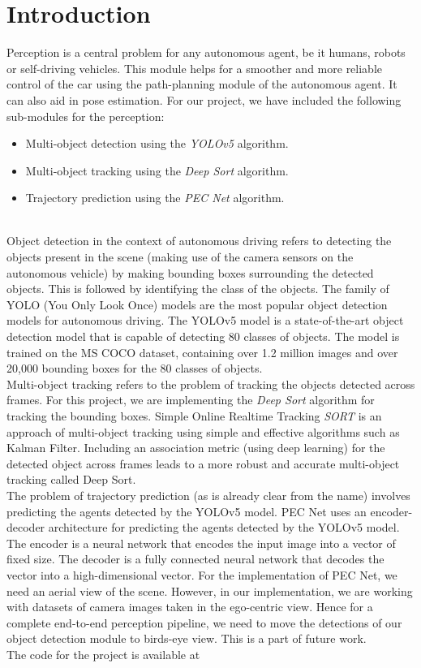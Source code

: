 \documentclass[conference]{IEEEtran}
\begin{document}
\section{Introduction}
Perception is a central problem for any autonomous agent, be it humans, robots or self-driving vehicles. This module helps for a smoother and more reliable control of the car using the path-planning module of the autonomous agent. It can also aid in pose estimation. For our project, we have included the following sub-modules for the perception:
\begin{itemize}
  \item Multi-object detection using the \textit{YOLOv5} algorithm.
  \item Multi-object tracking using the \textit{Deep Sort} algorithm.
  \item Trajectory prediction using the \textit{PEC Net} algorithm.
\end{itemize} \\
Object detection in the context of autonomous driving refers to detecting the objects present in the scene (making use of the camera sensors on the autonomous vehicle) by making bounding boxes surrounding the detected objects. This is followed by identifying the class of the objects. The family of YOLO (You Only Look Once) models are the most popular object detection models for autonomous driving. The YOLOv5 model is a state-of-the-art object detection model that is capable of detecting 80 classes of objects. The model is trained on the MS COCO dataset, containing over 1.2 million images and over 20,000 bounding boxes for the 80 classes of objects. \\
Multi-object tracking refers to the problem of tracking the objects detected across frames. For this project, we are implementing the \textit{Deep Sort} algorithm for tracking the bounding boxes. Simple Online Realtime Tracking \textit{SORT} is an approach of multi-object tracking using simple and effective algorithms such as Kalman Filter. Including an association metric (using deep learning) for the detected object across frames leads to a more robust and accurate multi-object tracking called Deep Sort. \\
The problem of trajectory prediction (as is already clear from the name) involves predicting the agents detected by the YOLOv5 model. PEC Net uses an encoder-decoder architecture for predicting the agents detected by the YOLOv5 model. The encoder is a neural network that encodes the input image into a vector of fixed size. The decoder is a fully connected neural network that decodes the vector into a high-dimensional vector. For the implementation of PEC Net, we need an aerial view of the scene. However, in our implementation, we are working with datasets of camera images taken in the ego-centric view. Hence for a complete end-to-end perception pipeline, we need to move the detections of our object detection module to birds-eye view. This is a part of future work. \\
The code for the project is available at %
\end{document}
